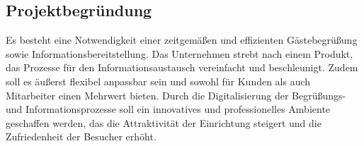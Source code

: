\subsection{Projektbegründung} 
\label{sec:Projektbegruendung}
Es besteht eine Notwendigkeit einer zeitgemäßen und effizienten Gästebegrüßung sowie Informationsbereitstellung.
Das Unternehmen strebt nach einem Produkt, das Prozesse für den Informationsaustausch vereinfacht und beschleunigt.
Zudem soll es äußerst flexibel anpassbar sein und sowohl für Kunden als auch Mitarbeiter einen Mehrwert bieten.
Durch die Digitalisierung der Begrüßungs- und Informationsprozesse soll ein innovatives und professionelles Ambiente geschaffen werden, das die Attraktivität der Einrichtung steigert und die Zufriedenheit der Besucher erhöht.




